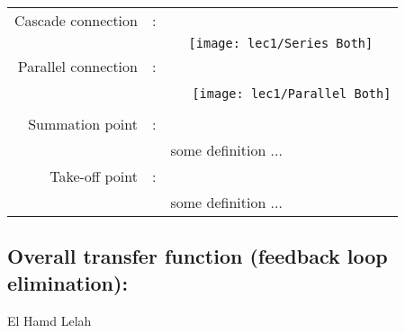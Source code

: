 \begin{tabular}{r p{0.1cm} c}
Cascade connection & : &\\
					&&  \texttt{[image: lec1/Series Both]}\\
Parallel connection & : &\\
					&&  \tiny\ \ \ \texttt{[image: lec1/Parallel Both]}\\
					&& \\
Summation point & : &\\
					&&  \multicolumn{1}{l}{some definition ...}\\
Take-off point & : &\\
					&&   \multicolumn{1}{l}{some definition ...}\\
\end{tabular}

\subsection[Overall transfer function]{Overall transfer function (feedback loop elimination):}
El Hamd Lelah